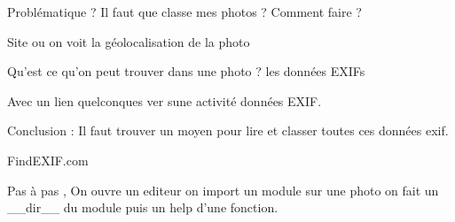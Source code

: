 Problématique ? 
	Il faut que classe mes photos ?  Comment faire ?


Site ou on voit la géolocalisation de la photo


Qu'est ce qu'on peut trouver dans une photo ? 
les données EXIFs 

Avec un lien quelconques ver sune activité données EXIF.

Conclusion : Il faut trouver un moyen pour lire et classer toutes ces données exif.


FindEXIF.com 

Pas à pas ,
On ouvre un editeur
on import un module
sur une photo
on fait un __dir__ du module
puis un help d'une fonction.

